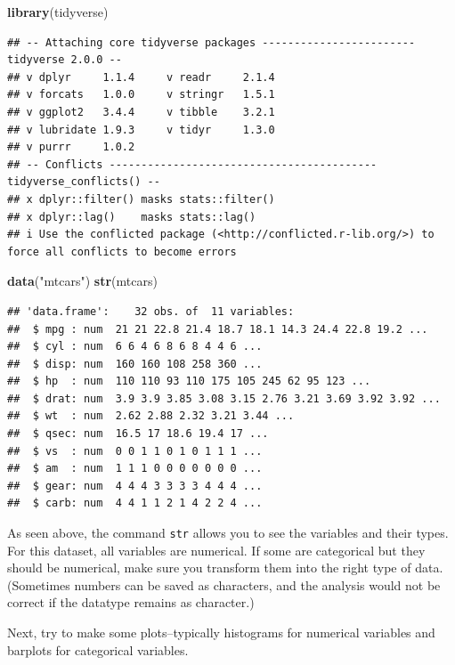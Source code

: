 \documentclass[
]{book}
\newenvironment{Shaded}{\begin{snugshade}}{\end{snugshade}}
\newcommand{\FunctionTok}[1]{\textcolor[rgb]{0.13,0.29,0.53}{\textbf{#1}}}
\newcommand{\NormalTok}[1]{#1}
\newcommand{\StringTok}[1]{\textcolor[rgb]{0.31,0.60,0.02}{#1}}
\begin{document}
\begin{Shaded}
\begin{Highlighting}[]
\FunctionTok{library}\NormalTok{(tidyverse)}
\end{Highlighting}
\end{Shaded}

\begin{verbatim}
## -- Attaching core tidyverse packages ------------------------ tidyverse 2.0.0 --
## v dplyr     1.1.4     v readr     2.1.4
## v forcats   1.0.0     v stringr   1.5.1
## v ggplot2   3.4.4     v tibble    3.2.1
## v lubridate 1.9.3     v tidyr     1.3.0
## v purrr     1.0.2     
## -- Conflicts ------------------------------------------ tidyverse_conflicts() --
## x dplyr::filter() masks stats::filter()
## x dplyr::lag()    masks stats::lag()
## i Use the conflicted package (<http://conflicted.r-lib.org/>) to force all conflicts to become errors
\end{verbatim}

\begin{Shaded}
\begin{Highlighting}[]
\FunctionTok{data}\NormalTok{(}\StringTok{"mtcars"}\NormalTok{)}
\FunctionTok{str}\NormalTok{(mtcars)}
\end{Highlighting}
\end{Shaded}

\begin{verbatim}
## 'data.frame':    32 obs. of  11 variables:
##  $ mpg : num  21 21 22.8 21.4 18.7 18.1 14.3 24.4 22.8 19.2 ...
##  $ cyl : num  6 6 4 6 8 6 8 4 4 6 ...
##  $ disp: num  160 160 108 258 360 ...
##  $ hp  : num  110 110 93 110 175 105 245 62 95 123 ...
##  $ drat: num  3.9 3.9 3.85 3.08 3.15 2.76 3.21 3.69 3.92 3.92 ...
##  $ wt  : num  2.62 2.88 2.32 3.21 3.44 ...
##  $ qsec: num  16.5 17 18.6 19.4 17 ...
##  $ vs  : num  0 0 1 1 0 1 0 1 1 1 ...
##  $ am  : num  1 1 1 0 0 0 0 0 0 0 ...
##  $ gear: num  4 4 4 3 3 3 3 4 4 4 ...
##  $ carb: num  4 4 1 1 2 1 4 2 2 4 ...
\end{verbatim}

As seen above, the command \texttt{str} allows you to see the variables and their types. For this dataset, all variables are numerical. If some are categorical but they should be numerical, make sure you transform them into the right type of data. (Sometimes numbers can be saved as characters, and the analysis would not be correct if the datatype remains as character.)

Next, try to make some plots--typically histograms for numerical variables and barplots for categorical variables.
\end{document}
